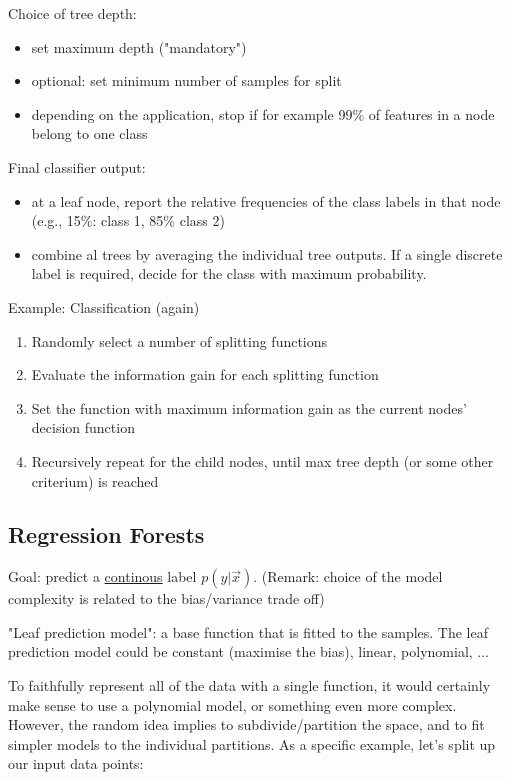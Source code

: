 Choice of tree depth:
\begin{itemize}
    \item set maximum depth ("mandatory")
    \item optional: set minimum number of samples for split
    \item depending on the application, stop if for example 99\% of features in a node belong to one class
\end{itemize}

Final classifier output:
\begin{itemize}
    \item at a leaf node, report the relative frequencies of the class labels in that node (e.g., 15\%: class 1, 85\% class 2)
    \item combine al trees by averaging the individual tree outputs. If a single discrete label is required, decide for the class with maximum probability.
\end{itemize}

Example: Classification (again)
\begin{enumerate}
    \item Randomly select a number of splitting functions
    \item Evaluate the information gain for each splitting function
    \item Set the function with maximum information gain as the current nodes' decision function
    \item Recursively repeat for the child nodes, until max tree depth (or some other criterium) is reached
\end{enumerate}

\newpage
\subsection*{Regression Forests}
Goal: predict a \underline{continous} label \(p(y|\vec{x})\). (Remark: choice of the model complexity is related to the bias/variance trade off)

"Leaf prediction model": a base function that is fitted to the samples. The leaf prediction model could be constant (maximise the bias), linear, polynomial, ...

To faithfully represent all of the data with a single function, it would certainly make sense to use a polynomial model, or something even more complex. However, the random idea implies to subdivide/partition the space, and to fit simpler models to the individual partitions. As a specific example, let's split up our input data points:

